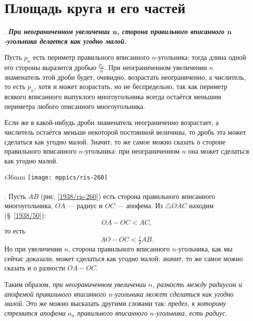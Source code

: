 

\section{Площадь круга и его частей}

\paragraph{}\label{1938/262}
.
\textbf{\emph{При неограниченном увеличении $\bm{n}$, сторона правильного вписанного $\bm{n}$-угольника делается как угодно малой.}}

Пусть $p_n$ есть периметр правильного вписанного $n$-угольника;
тогда длина одной его стороны выразится дробью $\frac {p_n}n$.
При неограниченном увеличении $n$ знаменатель этой дроби будет, очевидно, возрастать неограниченно, а числитель, то есть $p_n$, хотя и может возрастать, но не беспредельно,
так как периметр всякого вписанного выпуклого многоугольника всегда остаётся меньшим периметра любого описанного многоугольника.

Если же в какой-нибудь дроби знаменатель неограниченно возрастает, а числитель остаётся меньше некоторой постоянной величины, то дробь эта может сделаться как угодно малой.
Значит, то же самое можно сказать о стороне правильного вписанного $n$-угольника:
при неограниченном $n$ она может сделаться как угодно малой.

\begin{wrapfigure}[14]{r}{36mm}
\vskip-0mm
\centering
\texttt{[image: mppics/ris-260]}
\caption{}\label{1938/ris-260}
\end{wrapfigure}

\paragraph{}\label{1938/263}
\mbox{.}
Пусть $AB$ (рис. \ref{1938/ris-260}) есть сторона правильного вписанного многоугольника, $OA$ — радиус и $OC$ — апофема.
Из $\triangle OAC$ находим (§~\ref{1938/50}):
\[OA-OC<AC,\]
то есть
\[AO-OC<\tfrac12 AB.\]
Но при увеличении $n$, сторона правильного вписанного $n$-угольника, как мы сейчас доказали, может сделаться как угодно малой;
значит, то же самое можно сказать и о разности $OA-OC$.



Таким образом, \emph{при неограниченном увеличении $n$, разность между радиусом и апофемой правильного вписанного $n$-угольника может сделаться как угодно малой}.
Это же можно высказать другими словами так: 
\emph{предел, к которому стремится апофема $a_n$ правильного вписанного $n$-угольника, есть радиус.}



